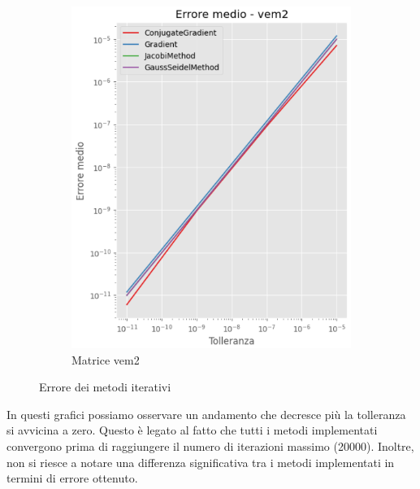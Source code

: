 \begin{figure}[!ht]
\begin{subfigure}{0.45\textwidth}
        \includegraphics[width=\textwidth]{./../report/Progetto_1_bis/img/error_vem2.png}
        \caption{Matrice vem2}
        \label{fig:error_vem2}
    \end{subfigure}
    \caption{Errore dei metodi iterativi}
    \label{fig:error}
\end{figure}

In questi grafici possiamo osservare un andamento che decresce più la tolleranza
si avvicina a zero. Questo è legato al fatto che tutti i metodi implementati
convergono prima di raggiungere il numero di iterazioni massimo (20000). Inoltre,
non si riesce a notare una differenza significativa tra i metodi implementati in termini
di errore ottenuto.

